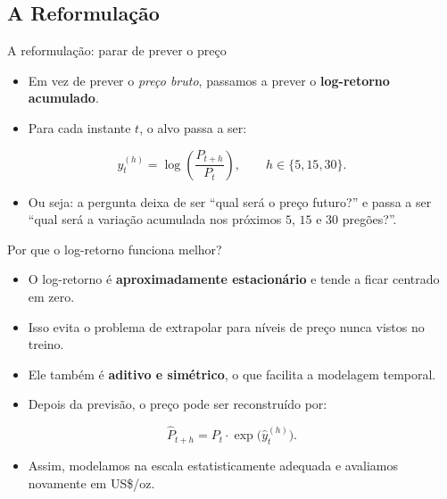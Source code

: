 \documentclass{libs/ufc_format}
\begin{document}
\subsection{A Reformulação}

\begin{frame}{A reformulação: parar de prever o preço}
    \begin{itemize}
        \item Em vez de prever o \emph{preço bruto}, passamos a prever o \textbf{log-retorno acumulado}.
        \item Para cada instante $t$, o alvo passa a ser:
    \end{itemize}

    \vspace{0.2cm}
    \begin{equation}
      y_t^{(h)} = \log\!\left(\frac{P_{t+h}}{P_t}\right),
      \qquad h \in \{5, 15, 30\}.
    \end{equation}

    \vspace{0.2cm}
    \begin{itemize}
        \item Ou seja: a pergunta deixa de ser ``qual será o preço futuro?'' e passa a ser ``qual será a variação acumulada nos próximos $5$, $15$ e $30$ pregões?''.
    \end{itemize}

    \vspace{0.3cm}
\end{frame}

\begin{frame}{Por que o log-retorno funciona melhor?}
    \begin{itemize}
        \item O log-retorno é \textbf{aproximadamente estacionário} e tende a ficar centrado em zero.
        \item Isso evita o problema de extrapolar para níveis de preço nunca vistos no treino.
        \item Ele também é \textbf{aditivo e simétrico}, o que facilita a modelagem temporal.
        \item Depois da previsão, o preço pode ser reconstruído por:
    \end{itemize}

    \vspace{0.2cm}
    \begin{equation}
      \hat{P}_{t+h} = P_t \cdot \exp\!\big(\hat{y}_t^{(h)}\big).
    \end{equation}

    \vspace{0.2cm}
    \begin{itemize}
        \item Assim, modelamos na escala estatisticamente adequada e avaliamos novamente em US\$/oz.
    \end{itemize}
\end{frame}
\end{document}
